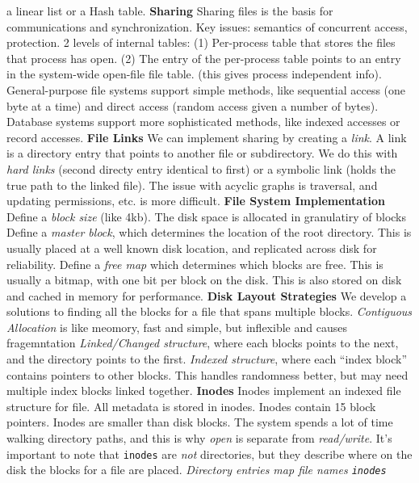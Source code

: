 a linear list or a Hash table.
{\bf Sharing}
Sharing files is the basis for communications and synchronization.
Key issues: semantics of concurrent access, protection.
2 levels of internal tables: (1) Per-process table that stores the files that
process has open. (2) The entry of the per-process table points to an entry in
the system-wide open-file file table. (this gives process independent info).
General-purpose file systems support simple methods, like sequential
access (one byte at a time) and direct access (random access given a
number of bytes).
Database systems support more sophisticated methods, like indexed
accesses or record accesses.
{\bf File Links}
We can implement sharing by creating a \emph{link}. A link is a
directory entry that points to another file or subdirectory. We do this
with \emph{hard links} (second directy entry identical to first) or a
symbolic link (holds the true path to the linked file).
The issue with acyclic graphs is traversal, and updating permissions,
etc. is more difficult.
{\bf File System Implementation}
Define a \emph{block size} (like 4kb). The disk space is allocated in
granulatiry of blocks
Define a \emph{master block}, which determines the location of the root
directory. This is usually placed at a well known disk location, and
replicated across disk for reliability.
Define a \emph{free map} which determines which blocks are free. This is
usually a bitmap, with one bit per block on the disk. This is also
stored on disk and cached in memory for performance.
{\bf Disk Layout Strategies}
We develop a solutions to finding all the blocks for a file that spans multiple
blocks.  \emph{Contiguous Allocation} is like meomory, fast and simple, but
inflexible and causes fragemntation \emph{Linked/Changed structure}, where each
blocks points to the next, and the directory points to the first.
\emph{Indexed structure}, where each ``index block'' contains pointers to other
blocks. This handles randomness better, but may need multiple index blocks
linked together.
{\bf Inodes}
Inodes implement an indexed file structure for file.
All metadata is stored in inodes.
Inodes contain 15 block pointers.
Inodes are smaller than disk blocks.
The system spends a lot of time walking directory paths, and this is why
\emph{open} is separate from \emph{read/write}.
It's important to note that \texttt{inodes} are \emph{not} directories,
but they describe where on the disk the blocks for a file are placed.
\emph{Directory entries map file names \texttt{inodes}}
